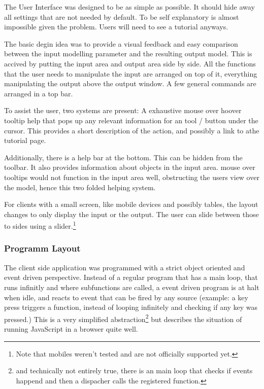 The User Interface was designed to be as simple as possible.
It should hide away all settings that are not needed by default.
To be self explanatory is almost impossible given the problem.
Users will need to see a tutorial anyways.

The basic degin idea was to provide a visual feedback and easy comparison between the input modelling parameter and the resulting output model.
This is accived by putting the input area and output area side by side.
All the functions that the user needs to manipulate the input are arranged on top of it, everything manipulating the output above the output window.
A few general commands are arranged in a top bar.

To assist the user, two systems are present: A exhaustive mouse over hoover tooltip help that pops up any relevant information for an tool / button under the cursor.
This provides a short description of the action, and possibly a link to athe tutorial page.

Additionally, there is a help bar at the bottom. This can be hidden from the toolbar.
It also provides information about objects in the input area.
mouse over tooltips would not function in the input area well, obstructing the users view over the model, hence this two folded helping system.

For clients with a small screen, like mobile devices and possibly tables, the layout changes to only display the input or the output. The user can slide between those to sides using a slider.\footnote{Note that mobiles weren't tested and are not officially supported yet.}


\subsubsection{Programm Layout}
\label{sec:client_prog_layout}

The client side application was programmed with a strict object oriented and event driven perspective.
Instead of a regular program that has a main loop, that runs infinitly and where subfunctions are called, a event driven program is at halt when idle, and reacts to event that can be fired by any source (example: a key press triggers a function, instead of looping infinitely and checking if any key was pressed.)
This is a very simplified abstraction\footnote{and technically not entirely true, there is an main loop that checks if events happend and then a dispacher calls the registered function.} but describes the situation of running JavaScript in a browser quite well.

